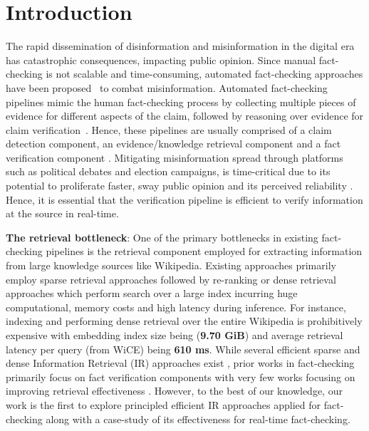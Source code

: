 \section{Introduction}
\label{sec:intro}


The rapid dissemination of disinformation and misinformation in the digital era has catastrophic consequences, impacting public opinion. Since manual fact-checking is not scalable and time-consuming, automated fact-checking approaches have been proposed~\cite{guo2022survey,yin-roth-2018-twowingos,read_twice,schuster2021vitamincrobustfact} to  combat misinformation. Automated fact-checking pipelines mimic the human fact-checking process by collecting multiple pieces of evidence for different aspects of the claim, followed by reasoning over evidence for claim verification~\cite{aly-vlachos-2022-natural,nakov2021automatedfactcheckingassistinghuman}.  Hence, these pipelines are usually comprised of a claim detection component, an evidence/knowledge retrieval component and a fact verification component \cite{thorne2018fever,programfc,jiang2020hover,kamoi2023wice}. Mitigating misinformation spread through platforms such as political debates and election campaigns, is time-critical due to its potential to proliferate faster, sway public opinion and its perceived reliability \cite{multimodal_spreads_faster,political_debates,multimodal_credibility}. Hence, it is essential that the verification pipeline is efficient to verify information at the source in real-time. 


\noindent \textbf{The retrieval bottleneck}: One of the primary bottlenecks in existing fact-checking pipelines is the retrieval component employed for extracting information from large knowledge sources like Wikipedia. Existing approaches primarily employ sparse retrieval approaches followed by re-ranking or dense retrieval approaches \cite{samarinas-etal-2021-improving, jiang2020hover,schlichtkrull-etal-2021-joint} which perform search over a large index incurring huge computational, memory costs and high latency during inference. For instance, indexing and performing dense retrieval over the entire Wikipedia is prohibitively expensive with embedding index size being (\textbf{9.70 GiB}) and average retrieval latency per query (from WiCE) being \textbf{610 ms}. While several efficient sparse and dense Information Retrieval (IR) approaches exist \cite{leonhardt2023efficientneuralrankingusing,efficient_inverted_index,jegou2011pq,ge2014opq}, prior works in fact-checking primarily focus on fact verification components with very few works focusing on improving retrieval effectiveness \cite{zheng-etal-2024-evidence}. However, to the best of our knowledge, our work is the first to explore principled efficient IR approaches applied for fact-checking along with a case-study of its effectiveness for real-time fact-checking.

